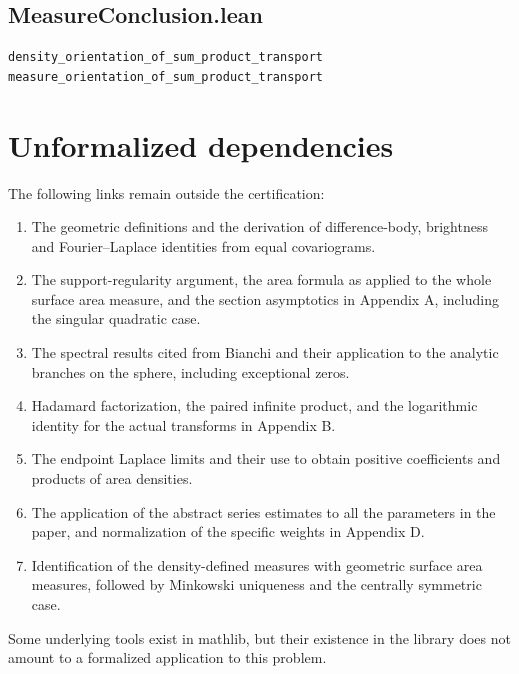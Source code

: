 \documentclass[11pt,a4paper]{article}
\begin{document}
\subsection*{MeasureConclusion.lean}
{\small\begin{verbatim}
density_orientation_of_sum_product_transport
measure_orientation_of_sum_product_transport
\end{verbatim}}

\section{Unformalized dependencies}
The following links remain outside the certification:
\begin{enumerate}
\item The geometric definitions and the derivation of difference-body,
      brightness and Fourier--Laplace identities from equal covariograms.
\item The support-regularity argument, the area formula as applied to
      the whole surface area measure, and the section asymptotics in
      Appendix A, including the singular quadratic case.
\item The spectral results cited from Bianchi and their application to
      the analytic branches on the sphere, including exceptional zeros.
\item Hadamard factorization, the paired infinite product, and the
      logarithmic identity for the actual transforms in Appendix B.
\item The endpoint Laplace limits and their use to obtain positive
      coefficients and products of area densities.
\item The application of the abstract series estimates to all the
      parameters in the paper, and normalization of the specific weights
      in Appendix D.
\item Identification of the density-defined measures with geometric
      surface area measures, followed by Minkowski uniqueness and the
      centrally symmetric case.
\end{enumerate}
Some underlying tools exist in mathlib, but their existence in the library
does not amount to a formalized application to this problem.
\end{document}
